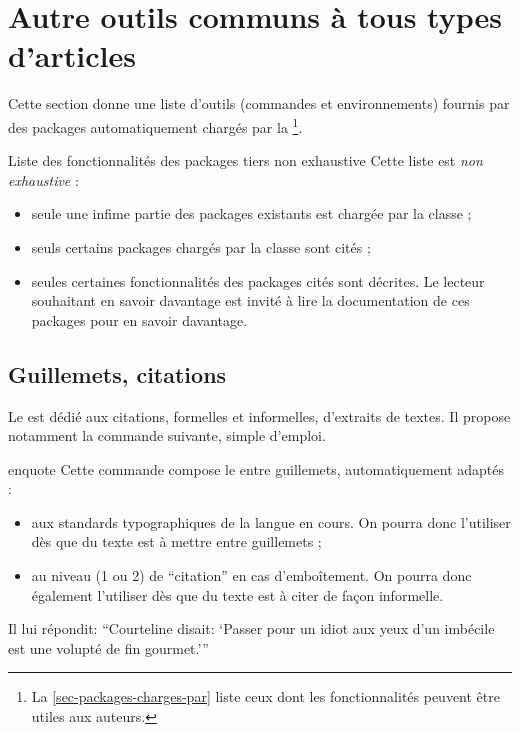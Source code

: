 \section{Autre outils communs à tous types d'articles}
\label{sec:outils-communs-tous-1}

Cette section donne une liste d'outils (commandes et environnements) fournis par
des packages automatiquement chargés par la \gztauthorcl\footnote{La
  \vref{sec-packages-charges-par} liste ceux dont les fonctionnalités peuvent
  être utiles aux auteurs.}.

\begin{dbwarning}{Liste des fonctionnalités des packages tiers non exhaustive}{}
  Cette liste est \emph{non exhaustive} :
  \begin{itemize}
  \item seule une infime partie des packages existants est chargée par la
    classe ;
  \item seuls certains packages chargés par la classe sont cités ;
  \item seules certaines fonctionnalités des packages cités sont décrites. Le
    lecteur souhaitant en savoir davantage est invité à lire la documentation de
    ces packages pour en savoir davantage.
  \end{itemize}
\end{dbwarning}

\subsection{Guillemets, citations}
\label{sec:guillemets-citations}

Le  est dédié aux citations, formelles et informelles,
d'extraits de textes. Il propose notamment la commande 
suivante, simple d'emploi.

\begin{docCommand}{enquote}{}
  Cette commande compose le  entre guillemets, automatiquement
  adaptés :
  \begin{itemize}
  \item aux standards typographiques de la langue en cours. On pourra donc
    l'utiliser dès que du texte est à mettre entre guillemets ;
  \item au niveau (1 ou 2) de \enquote{citation} en cas d'emboîtement. On
    pourra donc également l'utiliser dès que du texte est à citer de façon
    informelle.
  \end{itemize}
\begin{bodycode}
Il lui répondit: \enquote{Courteline disait: \enquote{Passer pour un idiot aux
    yeux d'un imbécile est une volupté de fin gourmet.}}
\end{bodycode}
\end{docCommand}

